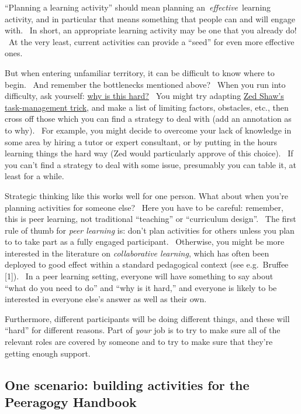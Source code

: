 ``Planning a learning activity'' should mean planning
an~\emph{effective}~learning activity, and in particular that means
something that people can and will engage with. ~In short, an
appropriate learning activity may be one that you already do! ~At the
very least, current activities can provide a ``seed'' for even more
effective ones.

But when entering unfamiliar territory, it can be difficult to know
where to begin.~ And remember the bottlenecks mentioned above?~ When you
run into difficulty, ask yourself:
\href{http://peeragogy.org/patterns-and-heuristics/}{why is this hard?}~
You might try adapting
\href{http://learnpythonthehardway.org/book/intro.html\#comment-409972596}{Zed
Shaw's task-management trick}, and make a list of limiting factors,
obstacles, etc., then cross off those which you can find a strategy to
deal with (add an annotation as to why). ~For example, you might decide
to overcome your lack of knowledge in some area by hiring a tutor or
expert consultant, or by putting in the hours learning things the hard
way (Zed would particularly approve of this choice).~ If you can't find
a strategy to deal with some issue, presumably you can table it, at
least for a while.

Strategic thinking like this works well for one person. What about when
you're planning activities for someone else? ~Here you have to be
careful: remember, this is peer learning, not traditional ``teaching''
or ``curriculum design''. ~The first rule of thumb for \emph{peer
learning} is: don't plan activities for others unless you plan to to
take part as a fully engaged participant.~ Otherwise, you might be more
interested in the literature on \emph{collaborative learning}, which has
often been deployed to good effect within a standard pedagogical context
(see e.g.~Bruffee {{[}1{]}}).~ In a peer learning setting, everyone will
have something to say about~ ``what do you need to do'' and ``why is it
hard,'' and everyone is likely to be interested in everyone else's
answer as well as their own.

Furthermore, different participants will be doing different things, and
these will ``hard'' for different reasons. Part of \emph{your} job is to
try to make sure all of the relevant roles are covered by someone and to
try to make sure that they're getting enough support.

\subsection{One scenario: building activities for the Peeragogy
Handbook}\label{one-scenario-building-activities-for-the-peeragogy-handbook}

